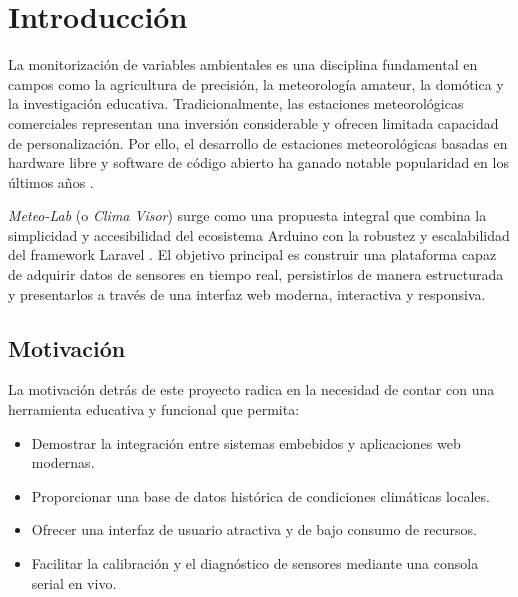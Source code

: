 \documentclass[12pt,a4paper]{report}
\begin{document}
\tableofcontents

\chapter{Introducción}
\label{ch:introduccion}

La monitorización de variables ambientales es una disciplina fundamental en campos como la agricultura de precisión, la meteorología amateur, la domótica y la investigación educativa. Tradicionalmente, las estaciones meteorológicas comerciales representan una inversión considerable y ofrecen limitada capacidad de personalización. Por ello, el desarrollo de estaciones meteorológicas basadas en hardware libre y software de código abierto ha ganado notable popularidad en los últimos años \cite{arduino2024}.

\textit{Meteo-Lab} (o \textit{Clima Visor}) surge como una propuesta integral que combina la simplicidad y accesibilidad del ecosistema Arduino con la robustez y escalabilidad del framework Laravel \cite{laravel2024}. El objetivo principal es construir una plataforma capaz de adquirir datos de sensores en tiempo real, persistirlos de manera estructurada y presentarlos a través de una interfaz web moderna, interactiva y responsiva.

\section{Motivación}
\label{sec:motivacion}

La motivación detrás de este proyecto radica en la necesidad de contar con una herramienta educativa y funcional que permita:
\begin{itemize}[leftmargin=*]
    \item Demostrar la integración entre sistemas embebidos y aplicaciones web modernas.
    \item Proporcionar una base de datos histórica de condiciones climáticas locales.
    \item Ofrecer una interfaz de usuario atractiva y de bajo consumo de recursos.
    \item Facilitar la calibración y el diagnóstico de sensores mediante una consola serial en vivo.
\end{itemize}
\end{document}
